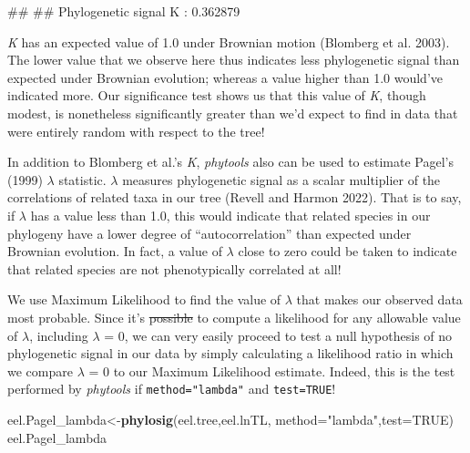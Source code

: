 \documentclass[fleqn,10pt,lineno]{wlpeerj}
\newenvironment{Shaded}{\begin{snugshade}}{\end{snugshade}}
\newcommand{\AttributeTok}[1]{\textcolor[rgb]{0.13,0.29,0.53}{#1}}
\newcommand{\ConstantTok}[1]{\textcolor[rgb]{0.56,0.35,0.01}{#1}}
\newcommand{\FunctionTok}[1]{\textcolor[rgb]{0.13,0.29,0.53}{\textbf{#1}}}
\newcommand{\NormalTok}[1]{#1}
\newcommand{\OtherTok}[1]{\textcolor[rgb]{0.56,0.35,0.01}{#1}}
\newcommand{\StringTok}[1]{\textcolor[rgb]{0.31,0.60,0.02}{#1}}
\providecommand{\DIFaddtex}[1]{{\protect\color{blue}\uwave{#1}}} %
\providecommand{\DIFdeltex}[1]{{\protect\color{red}\sout{#1}}}                      %
\providecommand{\DIFaddbegin}{} %
\providecommand{\DIFaddend}{} %
\providecommand{\DIFdelbegin}{} %
\providecommand{\DIFdelend}{} %
\providecommand{\DIFmodbegin}{} %
\providecommand{\DIFmodend}{} %
\providecommand{\DIFadd}[1]{\texorpdfstring{\DIFaddtex{#1}}{#1}} %
\providecommand{\DIFdel}[1]{\texorpdfstring{\DIFdeltex{#1}}{}} %
\newcommand{\DIFscaledelfig}{0.5}
\newlength{\DIFdelgraphicswidth} %
\newlength{\DIFdelgraphicsheight} %
\newcommand{\DIFaddincludegraphics}[2][]{{\color{blue}\fbox{\DIFOincludegraphics[#1]{#2}}}} %
\newcommand{\DIFdelincludegraphics}[2][]{%
\sbox{\DIFdelgraphicsbox}{\DIFOincludegraphics[#1]{#2}}%
\settoboxwidth{\DIFdelgraphicswidth}{\DIFdelgraphicsbox} %
\settoboxtotalheight{\DIFdelgraphicsheight}{\DIFdelgraphicsbox} %
\scalebox{\DIFscaledelfig}{%
\parbox[b]{\DIFdelgraphicswidth}{\usebox{\DIFdelgraphicsbox}\\[-\baselineskip] \rule{\DIFdelgraphicswidth}{0em}}\llap{\resizebox{\DIFdelgraphicswidth}{\DIFdelgraphicsheight}{%
\setlength{\unitlength}{\DIFdelgraphicswidth}%
\begin{picture}(1,1)%
\thicklines\linethickness{2pt} %
{\color[rgb]{1,0,0}\put(0,0){\framebox(1,1){}}}%
{\color[rgb]{1,0,0}\put(0,0){\line( 1,1){1}}}%
{\color[rgb]{1,0,0}\put(0,1){\line(1,-1){1}}}%
\end{picture}%
}\hspace*{3pt}}} %
} %
\DeclareRobustCommand{\DIFaddbegin}{\DIFOaddbegin \let\includegraphics\DIFaddincludegraphics} %
\DeclareRobustCommand{\DIFaddend}{\DIFOaddend \let\includegraphics\DIFOincludegraphics} %
\DeclareRobustCommand{\DIFdelbegin}{\DIFOdelbegin \let\includegraphics\DIFdelincludegraphics} %
\DeclareRobustCommand{\DIFdelend}{\DIFOaddend \let\includegraphics\DIFOincludegraphics} %
\begin{document}
\DIFmodbegin
\begin{DIFverbatim}[alsolanguage=DIFcode]
## 
## Phylogenetic signal K : 0.362879 
\end{DIFverbatim}
\DIFmodend

\emph{K} has an expected value of 1.0 under Brownian motion (Blomberg et
al. 2003). The lower value that we observe here thus indicates less
phylogenetic signal than expected under Brownian evolution; whereas a
value higher than 1.0 would've indicated more. Our significance test
shows us that this value of \emph{K}, though \DIFaddbegin \DIFadd{numerically }\DIFaddend modest, is
nonetheless significantly greater than we'd expect to find in data that
were entirely random with respect to the tree!

In addition to Blomberg et al.'s \emph{K}, \emph{phytools} also can be
used to estimate Pagel's (1999) \(\lambda\) statistic. \(\lambda\)
measures phylogenetic signal as a scalar multiplier of the correlations
of related taxa in our tree (Revell and Harmon 2022). That is to say, if
\(\lambda\) has a value less than 1.0, this would indicate that related
species in our phylogeny have a lower degree of ``autocorrelation'' than
expected under Brownian evolution. In fact, a value of \(\lambda\) close
to zero could be taken to indicate that related species are not
phenotypically correlated at all!

We use Maximum Likelihood to find the value of \(\lambda\) that makes
our observed data most probable. Since it's \DIFdelbegin \DIFdel{possible }\DIFdelend \DIFaddbegin \DIFadd{straightforward }\DIFaddend to compute a
likelihood for any allowable value of \(\lambda\), including \(\lambda\)
= 0, we can very easily proceed to test a null hypothesis of no
phylogenetic signal in our data by simply calculating a likelihood ratio
in which we compare \(\lambda\) = 0 to our Maximum Likelihood estimate.
Indeed, this is the test performed by \emph{phytools} if
\texttt{method="lambda"} and \texttt{test=TRUE}!

\begin{Shaded}
\begin{Highlighting}[]
\NormalTok{eel.Pagel\_lambda}\OtherTok{\textless{}{-}}\FunctionTok{phylosig}\NormalTok{(eel.tree,eel.lnTL,}
  \AttributeTok{method=}\StringTok{"lambda"}\NormalTok{,}\AttributeTok{test=}\ConstantTok{TRUE}\NormalTok{)}
\NormalTok{eel.Pagel\_lambda}
\end{Highlighting}
\end{Shaded}
\end{document}
